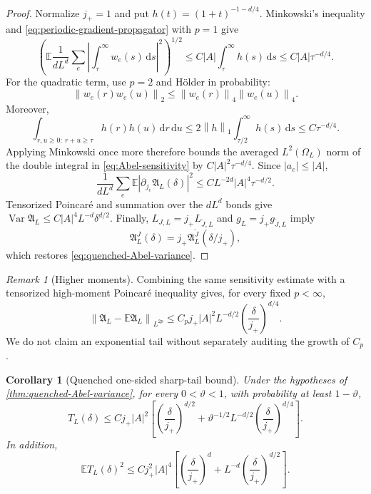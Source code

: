 \documentclass[11pt]{article}
\newtheorem{corollary}[theorem]{Corollary}
\theoremstyle{definition}
\theoremstyle{remark}
\newtheorem{remark}[theorem]{Remark}
\newcommand{\E}{\mathbb E}
\newcommand{\Var}{\operatorname{Var}}
\newcommand{\norm}[1]{\left\lVert #1\right\rVert}
\newcommand{\abs}[1]{\left\lvert #1\right\rvert}
\newcommand{\dd}{\,\mathrm d}
\begin{document}
\begin{proof}
Normalize $j_+=1$ and put
$h(t)=(1+t)^{-1-d/4}$.  Minkowski's inequality and
\eqref{eq:periodic-gradient-propagator} with $p=1$ give
\begin{equation}
 \left(
 \E\frac{1}{dL^d}\sum_e
 \left|\int_\tau^\infty w_e(s)\dd s\right|^2
 \right)^{1/2}
 \le C\abs A\int_\tau^\infty h(s)\dd s
 \le C\abs A\tau^{-d/4}.
 \label{eq:linear-sensitivity-tail}
\end{equation}
For the quadratic term, use $p=2$ and H\"older in probability:
\[
 \norm{w_e(r)w_e(u)}_2
 \le\norm{w_e(r)}_4\norm{w_e(u)}_4.
\]
Moreover,
\begin{equation}
 \int_{r,u\ge0:\ r+u\ge\tau}h(r)h(u)\dd r\dd u
 \le2\norm h_1\int_{\tau/2}^\infty h(s)\dd s
 \le C\tau^{-d/4}.
 \label{eq:convolution-tail}
\end{equation}
Applying Minkowski once more therefore bounds the averaged $L^2(\Omega_L)$
norm of the double integral in \eqref{eq:Abel-sensitivity} by
$C\abs A^2\tau^{-d/4}$.  Since $\abs{a_e}\le\abs A$,
\begin{equation}
 \frac{1}{dL^d}\sum_e
 \E\abs{\partial_{j_e}\mathfrak A_L(\delta)}^2
 \le CL^{-2d}\abs A^4\tau^{-d/2}.
 \label{eq:Abel-derivative-square}
\end{equation}
Tensorized Poincar\'e and summation over the $dL^d$ bonds give
$\Var\mathfrak A_L\le C\abs A^4L^{-d}\delta^{d/2}$.
Finally, $L_{J,L}=j_+L_{\widetilde J,L}$ and
$g_L=j_+g_{\widetilde J,L}$ imply
\[
 \mathfrak A_L^J(\delta)
 =j_+\mathfrak A_L^{\widetilde J}(\delta/j_+),
\]
which restores \eqref{eq:quenched-Abel-variance}.
\end{proof}

\begin{remark}[Higher moments]
Combining the same sensitivity estimate with a tensorized high-moment
Poincar\'e inequality gives, for every fixed $p<\infty$,
\begin{equation}
 \norm{\mathfrak A_L-\E\mathfrak A_L}_{L^{2p}}
 \le C_pj_+\abs A^2L^{-d/2}
 \left(\frac{\delta}{j_+}\right)^{d/4}.
 \label{eq:Abel-higher-moment}
\end{equation}
We do not claim an exponential tail without separately auditing the growth of
$C_p$.
\end{remark}

\begin{corollary}[Quenched one-sided sharp-tail bound]
\label{cor:quenched-sharp-tail}
Under the hypotheses of \cref{thm:quenched-Abel-variance}, for every
$0<\vartheta<1$, with probability at least $1-\vartheta$,
\begin{equation}
 \boxed{
 T_L(\delta)
 \le Cj_+\abs A^2\left[
 \left(\frac{\delta}{j_+}\right)^{d/2}
 +\vartheta^{-1/2}L^{-d/2}
 \left(\frac{\delta}{j_+}\right)^{d/4}
 \right].}
 \label{eq:quenched-sharp-tail}
\end{equation}
In addition,
\begin{equation}
 \E T_L(\delta)^2
 \le Cj_+^2\abs A^4\left[
 \left(\frac{\delta}{j_+}\right)^d
 +L^{-d}\left(\frac{\delta}{j_+}\right)^{d/2}
 \right].
 \label{eq:sharp-tail-second-moment}
\end{equation}
\end{corollary}
\end{document}
